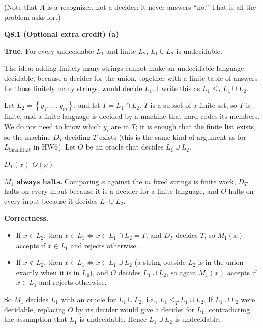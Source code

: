 \documentclass[11pt]{article}
\newcommand{\set}[1]{\left\{#1\right\}}
\newcommand{\lT}{\leq_T}
\newcommand{\Lsmh}{L_{\text{SmallHalt}}}
\newcommand{\qpage}[1]{\clearpage\noindent\textbf{\large #1}\par\medskip}
\begin{document}
(Note that $A$ is a recognizer, not a decider: it never answers ``no.''
That is all the problem asks for.)

\qpage{Q8.1 (Optional extra credit) (a)}

\textbf{True.} For every undecidable $L_1$ and finite $L_2$, $L_1 \cup L_2$ is undecidable.

The idea: adding finitely many strings cannot make an undecidable language decidable, because a decider for the union, together with a finite table of answers for those finitely many strings, would decide $L_1$.
I write this as $L_1 \lT L_1 \cup L_2$.

Let $L_2 = \set{y_1, \ldots, y_m}$, and let $T = L_1 \cap L_2$.
$T$ is a subset of a finite set, so $T$ is finite, and a finite language is decided by a machine that hard-codes its members.
We do not need to know which $y_i$ are in $T$; it is enough that the finite list exists, so the machine $D_T$ deciding $T$ exists (this is the same kind of argument as for $\Lsmh$ in HW6).
Let $O$ be an oracle that decides $L_1 \cup L_2$.

\begin{algorithmic}[1]
    \If{$x \in \set{y_1, \ldots, y_m}$} \Return $D_T(x)$ 
    \Else{} \Return $O(x)$
    \EndIf
  \EndFunction
\end{algorithmic}

\textbf{$M_1$ always halts.}
Comparing $x$ against the $m$ fixed strings is finite work, $D_T$ halts on every input because it is a decider for a finite language, and $O$ halts on every input because it decides $L_1 \cup L_2$.

\textbf{Correctness.}
\begin{itemize}
  \item If $x \in L_2$: then $x \in L_1 \iff x \in L_1 \cap L_2 = T$, and $D_T$ decides $T$, so $M_1(x)$ accepts if $x \in L_1$ and rejects otherwise.
  \item If $x \notin L_2$: then $x \in L_1 \iff x \in L_1 \cup L_2$ (a string outside $L_2$ is in the union exactly when it is in $L_1$), and $O$ decides $L_1 \cup L_2$, so again $M_1(x)$ accepts if $x \in L_1$ and rejects otherwise.
\end{itemize}
So $M_1$ decides $L_1$ with an oracle for $L_1 \cup L_2$, i.e., $L_1 \lT L_1 \cup L_2$.
If $L_1 \cup L_2$ were decidable, replacing $O$ by its decider would give a decider for $L_1$, contradicting the assumption that $L_1$ is undecidable.
Hence $L_1 \cup L_2$ is undecidable.
\end{document}
